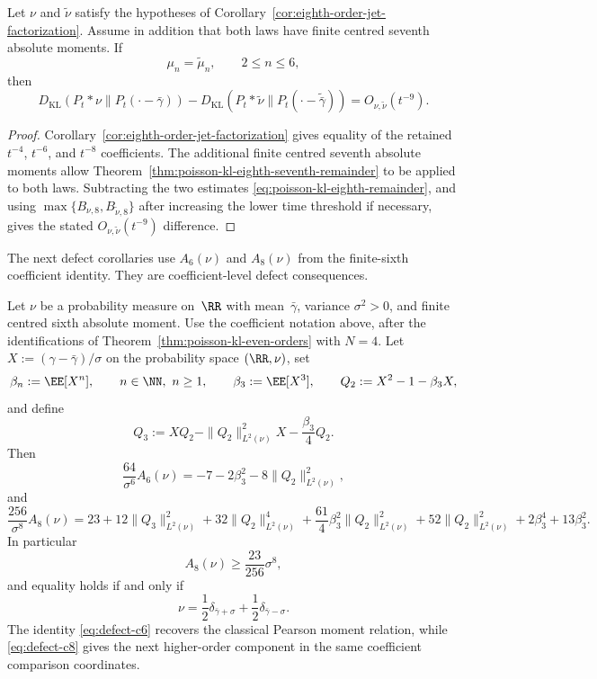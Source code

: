 \begin{corollary}%
\label{cor:eighth-order-jet-factorization-seventh-remainder}
Let $\nu$ and $\widetilde\nu$ satisfy the hypotheses of
Corollary~\ref{cor:eighth-order-jet-factorization}.  Assume in addition that
both laws have finite centred seventh absolute moments.  If
\[
\mu_n=\widetilde\mu_n,
\qquad 2\le n\le6,
\]
then
\[
D_{\mathrm{KL}}(P_t*\nu\|P_t(\cdot-\bar{\gamma}))
-D_{\mathrm{KL}}(P_t*\widetilde\nu\|P_t(\cdot-\widetilde{\bar{\gamma}}))
=O_{\nu,\widetilde\nu}(t^{-9}).
\]
\end{corollary}

\begin{proof}
Corollary~\ref{cor:eighth-order-jet-factorization} gives equality of the
retained \(t^{-4}\), \(t^{-6}\), and \(t^{-8}\) coefficients.  The additional
finite centred seventh absolute moments allow
Theorem~\ref{thm:poisson-kl-eighth-seventh-remainder} to be applied to both
laws.  Subtracting the two estimates \eqref{eq:poisson-kl-eighth-remainder},
and using
\(\max\{B_{\nu,8},B_{\widetilde\nu,8}\}\) after increasing the lower time
threshold if necessary, gives the stated
\(O_{\nu,\widetilde\nu}(t^{-9})\) difference.
\end{proof}

\fi

The next defect corollaries use
\(A_6(\nu)\) and \(A_8(\nu)\) from the
finite-sixth coefficient identity.  They are coefficient-level defect
consequences.

\begin{corollary}%
\label{thm:poisson-defect-ladder}
\label{cor:coefficient-defect-coupling}
Let $\nu$ be a probability measure on~$\RR$ with mean~$\bar{\gamma}$,
variance $\sigma^2>0$, and finite centred sixth absolute moment.  Use the
coefficient notation above, after the identifications of
Theorem~\ref{thm:poisson-kl-even-orders} with \(N=4\).
Let $X:=(\gamma-\bar{\gamma})/\sigma$ on the probability space
$(\RR,\nu)$, set
\[
\beta_n:=\EE[X^n],\qquad n\in\NN,\ n\ge1,\qquad
\beta_3:=\EE[X^3],
\qquad
Q_2:=X^2-1-\beta_3X,
\]
and define
\[
Q_3:=XQ_2-\|Q_2\|_{L^2(\nu)}^2X-\frac{\beta_3}{4}Q_2.
\]
Then
\begin{equation}\label{eq:defect-c6}
\frac{64}{\sigma^6}A_6(\nu)
=-7-2\beta_3^2-8\|Q_2\|_{L^2(\nu)}^2,
\end{equation}
and
\begin{equation}\label{eq:defect-c8}
\frac{256}{\sigma^8}A_8(\nu)
=23
+12\|Q_3\|_{L^2(\nu)}^2
+32\|Q_2\|_{L^2(\nu)}^4
+\frac{61}{4}\beta_3^2\|Q_2\|_{L^2(\nu)}^2
+52\|Q_2\|_{L^2(\nu)}^2
+2\beta_3^4
+13\beta_3^2.
\end{equation}
In particular
\begin{equation}\label{eq:defect-c8-lower}
A_8(\nu)\ge \frac{23}{256}\sigma^8,
\end{equation}
and equality holds if and only if
\[
\nu=\frac12\delta_{\bar{\gamma}+\sigma}
+\frac12\delta_{\bar{\gamma}-\sigma}.
\]
The identity \eqref{eq:defect-c6} recovers the classical Pearson
moment relation, while \eqref{eq:defect-c8} gives the next higher-order
component in the same coefficient comparison coordinates.
\end{corollary}

